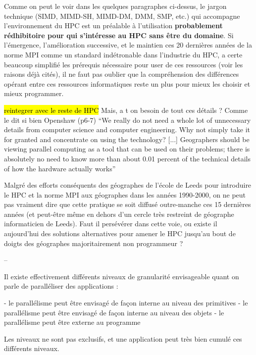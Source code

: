 Comme on peut le voir dans les quelques paragraphes ci-dessus, le jargon technique (SIMD, MIMD-SH, MIMD-DM, DMM, SMP, etc.)  qui accompagne l'environnement du HPC est un préalable à l'utilisation \textbf{probablement rédhibitoire pour qui s'intéresse au HPC sans être du domaine}. Si l'émergence, l'amélioration successive, et le maintien ces 20 dernières années de la norme MPI comme un standard indétronable dans l'industrie du HPC, a certe beaucoup simplifié les prérequis nécessaire pour user de ces ressources (voir les raisons déjà cités), il ne faut pas oublier que la compréhension des différences opérant entre ces ressources informatiques reste un plus pour mieux les choisir et mieux programmer. 

\hl{reintegrer avec le reste de HPC}
Mais, a t on besoin de tout ces détails ? Comme le dit si bien Openshaw (p6-7) “We really do not need a whole lot of unnecessary details from computer science and computer engineering. Why not simply take it for granted and concentrate on using the technology? [...] Geographers should be viewing parallel computing as a tool that can be used on their problems; there is absolutely no need to know more than about 0.01 percent of the technical details of how the hardware actually works”



Malgré des efforts conséquents des géographes de l'école de Leeds \autocite{Openshaw2000} pour introduire le HPC et la norme MPI aux géographes dans les années 1990-2000, on ne peut pas vraiment dire que cette pratique se soit diffusé outre-manche ces 15 dernières années (et peut-être même en dehors d'un cercle très restreint de géographe informaticien de Leeds). Faut il persévérer dans cette voie, ou existe il aujourd'hui des solutions alternatives pour amener le HPC jusqu'au bout de doigts des géographes majoritairement non programmeur ?

--

Il existe effectivement différents niveaux de granularité envisageable quant on parle de paralléliser des applications : 

- le parallélisme peut être envisagé de façon interne au niveau des primitives 
- le parallélisme peut être envisagé de façon interne au niveau des objets
- le parallélisme peut être externe au programme

Les niveaux ne sont pas exclusifs, et une application peut très bien cumulé ces différents niveaux.



